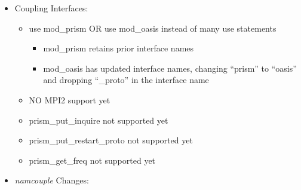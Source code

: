 \begin{itemize}
\item Coupling Interfaces:

\begin{itemize}
\item use mod\_prism OR use mod\_oasis instead of many use statements
\begin{itemize}
  \item mod\_prism retains prior interface names
  \item mod\_oasis has updated interface names, changing ``prism'' to ``oasis'' and
    dropping ``\_proto'' in the interface name
\end{itemize}
\item NO MPI2 support yet
\item prism\_put\_inquire not supported yet
\item prism\_put\_restart\_proto not supported yet
\item prism\_get\_freq not supported yet
\end{itemize}

\item {\it namcouple} Changes:


\end{itemize}
